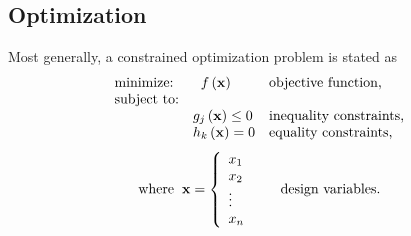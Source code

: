 \documentclass[12pt,a4paper,oneside]{book}
\begin{document}
\subsection{Optimization}
Most generally, a constrained optimization problem is stated as 
\[
\begin{array}{lll}
\mbox{minimize:} & \hspace{2 mm} f\left(\mathbf{x}\right) & \mbox{objective function,}\\
\mbox{subject to:} & & \\
& \centering g_j \left( \mathbf{x} \right) \leq 0 & \mbox{inequality constraints,}\\
& \centering h_k \left(\mathbf{x} \right) = 0 & \mbox{equality constraints,}
\end{array}
 \]
\[ 
\begin{array}{ll}
\mbox{where} \hspace{2 mm} \mathbf{x} = \left\{ \begin{array}{ll}
x_1 & \\
x_2 & \\
\vdots &\\
x_n &
\end{array} \right. & \mbox{design variables.}
\end{array}
\]
\end{document}
